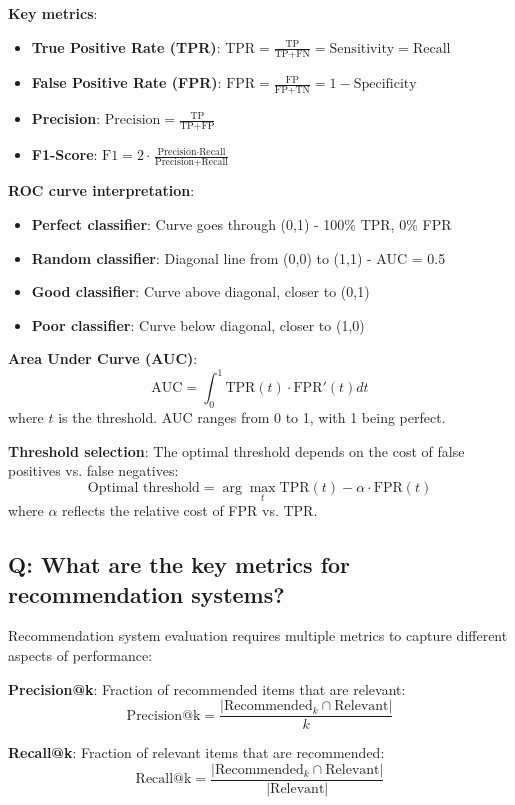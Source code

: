 \textbf{Key metrics}:
\begin{itemize}
	\item \textbf{True Positive Rate (TPR)}: \(\text{TPR} = \frac{\text{TP}}{\text{TP} + \text{FN}} = \text{Sensitivity} = \text{Recall}\)
	\item \textbf{False Positive Rate (FPR)}: \(\text{FPR} = \frac{\text{FP}}{\text{FP} + \text{TN}} = 1 - \text{Specificity}\)
	\item \textbf{Precision}: \(\text{Precision} = \frac{\text{TP}}{\text{TP} + \text{FP}}\)
	\item \textbf{F1-Score}: \(\text{F1} = 2 \cdot \frac{\text{Precision} \cdot \text{Recall}}{\text{Precision} + \text{Recall}}\)
\end{itemize}

\textbf{ROC curve interpretation}:
\begin{itemize}
	\item \textbf{Perfect classifier}: Curve goes through (0,1) - 100\% TPR, 0\% FPR
	\item \textbf{Random classifier}: Diagonal line from (0,0) to (1,1) - AUC = 0.5
	\item \textbf{Good classifier}: Curve above diagonal, closer to (0,1)
	\item \textbf{Poor classifier}: Curve below diagonal, closer to (1,0)
\end{itemize}

\textbf{Area Under Curve (AUC)}:
\[
	\text{AUC} = \int_0^1 \text{TPR}(t) \cdot \text{FPR}'(t) dt
\]
where \(t\) is the threshold. AUC ranges from 0 to 1, with 1 being perfect.

\textbf{Threshold selection}:
The optimal threshold depends on the cost of false positives vs. false negatives:
\[
	\text{Optimal threshold} = \arg\max_t \text{TPR}(t) - \alpha \cdot \text{FPR}(t)
\]
where \(\alpha\) reflects the relative cost of FPR vs. TPR.

\subsection*{Q: What are the key metrics for recommendation systems?}
Recommendation system evaluation requires multiple metrics to capture different aspects of performance:

\textbf{Precision@k}: Fraction of recommended items that are relevant:
\[
	\text{Precision@k} = \frac{|\text{Recommended}_k \cap \text{Relevant}|}{k}
\]

\textbf{Recall@k}: Fraction of relevant items that are recommended:
\[
	\text{Recall@k} = \frac{|\text{Recommended}_k \cap \text{Relevant}|}{|\text{Relevant}|}
\]

